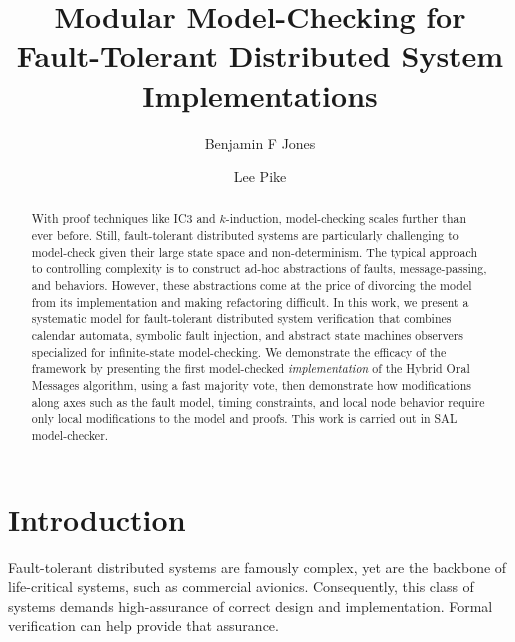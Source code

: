 \documentclass{llncs/llncs}
\newcommand{\lee}[1]{ } %
\newcommand{\lee}[1]{ {\color{blue}$<$lee: #1$>$} } %
\begin{document}
\title{Modular Model-Checking for Fault-Tolerant Distributed System Implementations}

\author{Benjamin F Jones \and Lee Pike}




\maketitle


\begin{abstract}
With proof techniques like IC3 and $k$-induction, model-checking scales further
than ever before.  Still, fault-tolerant distributed systems are particularly
challenging to model-check given their large state space and
non-determinism. The typical approach to controlling complexity is to construct
ad-hoc abstractions of faults, message-passing, and behaviors.  However, these
abstractions come at the price of divorcing the model from its implementation
and making refactoring difficult. In this work, we present a systematic model for
fault-tolerant distributed system verification that combines calendar automata,
symbolic fault injection, and abstract state machines observers specialized for
infinite-state model-checking. We demonstrate the efficacy of the framework by presenting the
first model-checked \emph{implementation} of the Hybrid Oral Messages algorithm,
using a fast majority vote, then demonstrate how modifications along axes such
as the fault model, timing constraints, and local node behavior require only local modifications
to the model and proofs. This work is carried out in SAL model-checker.
\end{abstract}

\lee{grep to get consistent manifest/benign, also lieutenant vs relay/receiver.}
\lee{grep for synchronous observers section references}
\lee{grep for first use of ``synchronous composition'' and give pointer to SAL semantics}

\section{Introduction}

Fault-tolerant distributed systems are famously complex, yet are the backbone of life-critical systems, such as commercial avionics. Consequently, this class of systems demands high-assurance of correct design and implementation. Formal verification can help provide that assurance.
\end{document}
